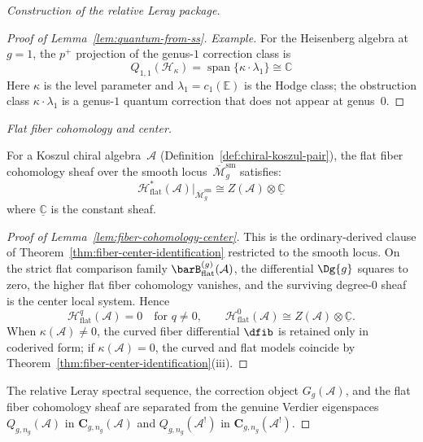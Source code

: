 \begin{proof}[Construction of the relative Leray package]
\begin{proof}[Proof of Lemma~\ref{lem:quantum-from-ss}]
\emph{Example.} For the Heisenberg algebra at $g=1$, the $p^+$
projection of the genus-$1$ correction class is
\begin{equation}
Q_{1,1}(\mathcal{H}_\kappa)
= \operatorname{span}\{\kappa \cdot \lambda_1\} \cong \mathbb{C}
\end{equation}
Here $\kappa$ is the level parameter and $\lambda_1 = c_1(\mathbb{E})$ is the Hodge class;
the obstruction class $\kappa \cdot \lambda_1$ is a genus-$1$ quantum correction
that does not appear at genus~$0$.
\end{proof}

\emph{Flat fiber cohomology and center.}

\begin{lemma}
\label{lem:fiber-cohomology-center}
For a Koszul chiral algebra~$\mathcal{A}$
\textup{(}Definition~\textup{\ref{def:chiral-koszul-pair})},
the flat fiber cohomology sheaf over the smooth
locus~$\overline{\mathcal{M}}_g^{\mathrm{sm}}$ satisfies:
\begin{equation}
\mathcal{H}^*_{\mathrm{flat}}(\mathcal{A})
\big|_{\overline{\mathcal{M}}_g^{\mathrm{sm}}}
\cong Z(\mathcal{A}) \otimes \underline{\mathbb{C}}
\end{equation}
where $\underline{\mathbb{C}}$ is the constant sheaf.
\end{lemma}

\begin{proof}[Proof of Lemma~\ref{lem:fiber-cohomology-center}]
This is the ordinary-derived clause of
Theorem~\ref{thm:fiber-center-identification} restricted to the smooth
locus. On the strict flat comparison family
$\barB^{(g)}_{\mathrm{flat}}(\mathcal{A})$, the differential
$\Dg{g}$ squares to zero, the higher flat fiber cohomology vanishes,
and the surviving degree-$0$ sheaf is the center local system.
Hence
\[
\mathcal{H}^q_{\mathrm{flat}}(\mathcal{A}) = 0
\quad\text{for } q \neq 0,
\qquad
\mathcal{H}^0_{\mathrm{flat}}(\mathcal{A})
\cong Z(\mathcal{A}) \otimes \underline{\mathbb{C}}.
\]
When $\kappa(\mathcal{A}) \neq 0$, the curved fiber differential
$\dfib$ is retained only in coderived form; if $\kappa(\mathcal{A})=0$,
the curved and flat models coincide by
Theorem~\ref{thm:fiber-center-identification}(iii).
\end{proof}

The relative Leray spectral sequence, the correction object
$G_g(\mathcal{A})$, and the flat fiber cohomology sheaf are separated
from the genuine Verdier eigenspaces $Q_{g,n_g}(\mathcal{A})$ in
$\mathbf C_{g,n_g}(\mathcal A)$ and $Q_{g,n_g}(\mathcal{A}^!)$ in
$\mathbf C_{g,n_g}(\mathcal A^!)$.
\end{proof}

